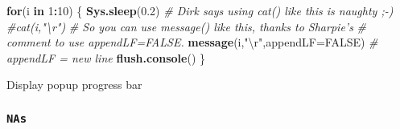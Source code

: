 \documentclass[10,portrait]{article}
\newenvironment{Shaded}{\begin{snugshade}}{\end{snugshade}}
\newcommand{\KeywordTok}[1]{\textcolor[rgb]{0.13,0.29,0.53}{\textbf{#1}}}
\newcommand{\DataTypeTok}[1]{\textcolor[rgb]{0.13,0.29,0.53}{#1}}
\newcommand{\DecValTok}[1]{\textcolor[rgb]{0.00,0.00,0.81}{#1}}
\newcommand{\FloatTok}[1]{\textcolor[rgb]{0.00,0.00,0.81}{#1}}
\newcommand{\CharTok}[1]{\textcolor[rgb]{0.31,0.60,0.02}{#1}}
\newcommand{\StringTok}[1]{\textcolor[rgb]{0.31,0.60,0.02}{#1}}
\newcommand{\CommentTok}[1]{\textcolor[rgb]{0.56,0.35,0.01}{\textit{#1}}}
\newcommand{\OtherTok}[1]{\textcolor[rgb]{0.56,0.35,0.01}{#1}}
\newcommand{\ControlFlowTok}[1]{\textcolor[rgb]{0.13,0.29,0.53}{\textbf{#1}}}
\newcommand{\OperatorTok}[1]{\textcolor[rgb]{0.81,0.36,0.00}{\textbf{#1}}}
\newcommand{\NormalTok}[1]{#1}
\begin{document}
\begin{Shaded}
\begin{Highlighting}[]
\ControlFlowTok{for}\NormalTok{(i }\ControlFlowTok{in} \DecValTok{1}\OperatorTok{:}\DecValTok{10}\NormalTok{) \{}
  \KeywordTok{Sys.sleep}\NormalTok{(}\FloatTok{0.2}\NormalTok{)}
  \CommentTok{# Dirk says using cat() like this is naughty ;-)}
  \CommentTok{#cat(i,"\textbackslash{}r")}
  \CommentTok{# So you can use message() like this, thanks to Sharpie's}
  \CommentTok{# comment to use appendLF=FALSE.}
  \KeywordTok{message}\NormalTok{(i,}\StringTok{"}\CharTok{\textbackslash{}r}\StringTok{"}\NormalTok{,}\DataTypeTok{appendLF=}\OtherTok{FALSE}\NormalTok{) }\CommentTok{# appendLF = new line }
  \KeywordTok{flush.console}\NormalTok{()}
\NormalTok{\}}
\end{Highlighting}
\end{Shaded}

Display popup progress bar

\begin{Shaded}
\end{Shaded}

\subsubsection{\texorpdfstring{\texttt{NAs}}{NAs}}\label{nas}
\end{document}

